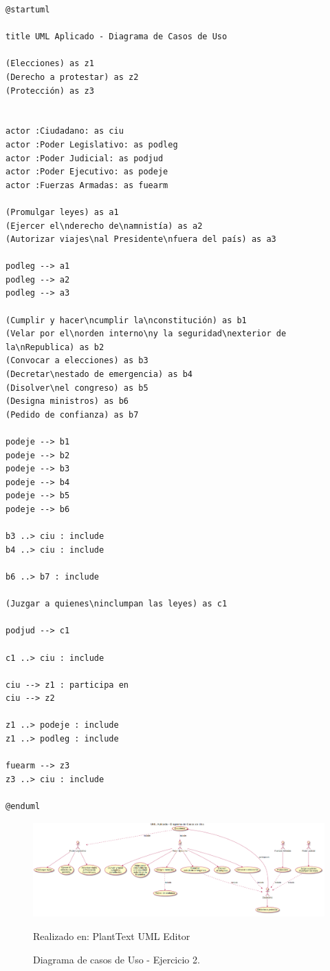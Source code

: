 \documentclass[a4paper,12pt]{article}
\begin{document}
\begin{lstlisting}
@startuml

title UML Aplicado - Diagrama de Casos de Uso 

(Elecciones) as z1
(Derecho a protestar) as z2
(Protección) as z3


actor :Ciudadano: as ciu
actor :Poder Legislativo: as podleg
actor :Poder Judicial: as podjud
actor :Poder Ejecutivo: as podeje
actor :Fuerzas Armadas: as fuearm

(Promulgar leyes) as a1
(Ejercer el\nderecho de\namnistía) as a2
(Autorizar viajes\nal Presidente\nfuera del país) as a3

podleg --> a1
podleg --> a2
podleg --> a3

(Cumplir y hacer\ncumplir la\nconstitución) as b1
(Velar por el\norden interno\ny la seguridad\nexterior de la\nRepublica) as b2
(Convocar a elecciones) as b3
(Decretar\nestado de emergencia) as b4
(Disolver\nel congreso) as b5
(Designa ministros) as b6
(Pedido de confianza) as b7

podeje --> b1
podeje --> b2
podeje --> b3
podeje --> b4
podeje --> b5
podeje --> b6

b3 ..> ciu : include
b4 ..> ciu : include

b6 ..> b7 : include

(Juzgar a quienes\ninclumpan las leyes) as c1

podjud --> c1

c1 ..> ciu : include

ciu --> z1 : participa en
ciu --> z2 

z1 ..> podeje : include
z1 ..> podleg : include

fuearm --> z3
z3 ..> ciu : include

@enduml
\end{lstlisting}

\clearpage
\newpage
    
    \begin{landscape}
    

\begin{figure}[p]
        \centering        
        \includegraphics[width=1.5\textwidth]{images/umlA01.PNG}
        \caption{Diagrama de casos de Uso - Ejercicio 2.}  
        {{\footnotesize Realizado en: PlantText UML Editor }}
\end{figure}

    \end{landscape}
\end{document}
